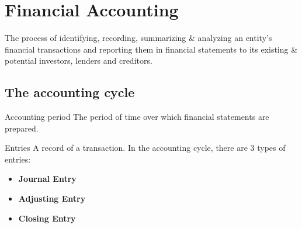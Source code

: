\section{Financial Accounting}

The process of identifying, recording, summarizing \& analyzing an entity's financial transactions and reporting them in financial statements to its existing \& potential investors, lenders and creditors.

\subsection{The accounting cycle}

\begin{definition}
    {Accounting period}
    The period of time over which financial statements are prepared.
\end{definition}

\begin{knBox}
    {Entries}
    A record of a transaction. In the accounting cycle, there are 3 types of entries:
    \begin{itemize}
        \item \textbf{Journal Entry}
        \item \textbf{Adjusting Entry}
        \item \textbf{Closing Entry}
    \end{itemize}
\end{knBox}

